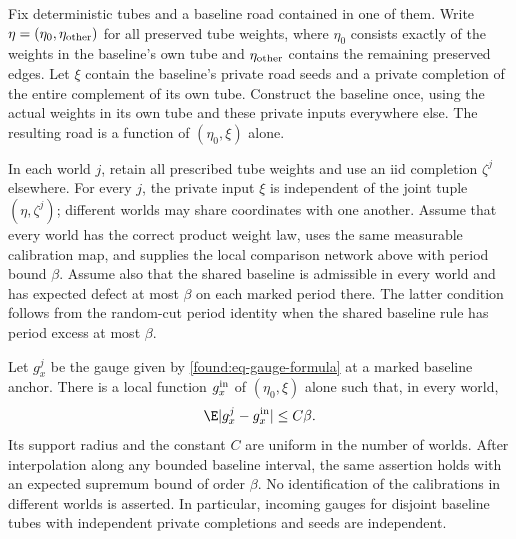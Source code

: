 \begin{lemma}
\label{found:lem-common-gauge}
Fix deterministic tubes and a baseline road contained in one of them.
Write $\eta=(\eta_0,\eta_{\rm other})$ for all preserved tube weights,
where $\eta_0$ consists exactly of the weights in the baseline's own
tube and $\eta_{\rm other}$ contains the remaining preserved edges.
Let $\xi$ contain the baseline's private road seeds and a private
completion of the entire complement of its own tube.  Construct the
baseline once, using the actual weights in its own tube and these
private inputs everywhere else.  The resulting road is a function of
$(\eta_0,\xi)$ alone.

In each world $j$, retain all prescribed tube weights and use an iid
completion $\zeta^j$ elsewhere.  For every $j$, the private input
$\xi$ is independent of the joint tuple $(\eta,\zeta^j)$; different
worlds may share coordinates with one another.  Assume that every world
has the correct product weight law, uses the same measurable
calibration map, and supplies the local comparison network above with
period bound $\beta$.  Assume also that the shared baseline is
admissible in every world and has expected defect at most $\beta$ on
each marked period there.  The latter condition follows from the
random-cut period identity when the shared baseline rule has period
excess at most $\beta$.

Let $g_x^j$ be the gauge given by \eqref{found:eq-gauge-formula} at a
marked baseline anchor.  There is a local function $g_x^{\rm in}$ of
$(\eta_0,\xi)$ alone such that, in every world,
\begin{equation}
 \E |g_x^j-g_x^{\rm in}|\leq C\beta.
                                                        \label{found:eq-common-gauge}
\end{equation}
Its support radius and the constant $C$ are uniform in the number of
worlds.  After interpolation along any bounded baseline interval,
the same assertion holds with an expected supremum bound of order
$\beta$.  No identification of the calibrations in different worlds
is asserted.  In particular, incoming gauges for disjoint baseline
tubes with independent private completions and seeds are independent.
\end{lemma}

